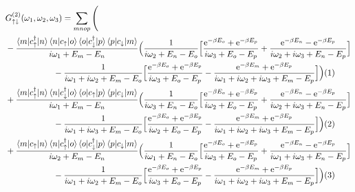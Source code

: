 \documentclass[12pt,a4paper]{scrartcl}
\numberwithin{equation}{section}
\renewcommand{\exp}[1]{\mathrm{e}^{#1}}
\begin{document}
\begin{align}
& G^{(2)}_{\uparrow \downarrow}(\omega_1,\omega_2,\omega_3)
=  \sum_{mnop} \Bigg( \nonumber \\
    & -
 \frac{\braket{m|c^{\dagger}_{\uparrow}|n}\braket{n| c_{\uparrow}|o}\braket{o| c^{\dagger}_{\downarrow} |p}\braket{p| c_{\downarrow} |m}}{i\omega_1 +E_m-E_n}
 \Big( \frac{1}{i\omega_2 +E_n-E_o}
 \Big[
 \frac{\exp{-\beta E_o}+\exp{-\beta E_p} }{i\omega_3 +E_o-E_p} 
  + \frac{ \exp{-\beta E_n} - \exp{-\beta E_p} }{ i\omega_2 + i\omega_3 + E_n- E_p } 
 \Big] \nonumber \\
 & \hspace*{2cm} -  \frac{1}{i\omega_1+ i\omega_2 + E_m-E_o}
 \Big[
  \frac{\exp{-\beta E_o}+\exp{-\beta E_p} }{i\omega_3 +E_o-E_p} 
 -  \frac{ \exp{-\beta E_m}+\exp{-\beta E_p} }{ i\omega_1 + i\omega_2 + i\omega_3 + E_m- E_p } 
 \Big]
 \Big)  (1) \nonumber\\
    &+ 
 \frac{\braket{m|c^{\dagger}_{\uparrow}|n}\braket{n| c^{\dagger}_{\downarrow} |o}\braket{o|c_{\uparrow} |p}\braket{p|c_{\downarrow} |m}}{i\omega_1 +E_m-E_n}
 \Big( \frac{1}{i\omega_3 +E_n-E_o}
 \Big[
 \frac{\exp{-\beta E_o}+\exp{-\beta E_p} }{i\omega_2 +E_o-E_p} 
  + \frac{ \exp{-\beta E_n} - \exp{-\beta E_p} }{ i\omega_2 + i\omega_3 + E_n- E_p } 
 \Big] \nonumber \\
 & \hspace*{2cm} -  \frac{1}{i\omega_1+ i\omega_3 + E_m-E_o}
 \Big[
  \frac{\exp{-\beta E_o}+\exp{-\beta E_p} }{i\omega_2 +E_o-E_p} 
 -  \frac{ \exp{-\beta E_m}+\exp{-\beta E_p} }{ i\omega_1 + i\omega_2 + i\omega_3 + E_m- E_p } 
 \Big]
 \Big) (2) \nonumber  \\
     &+
 \frac{\braket{m|c_{\uparrow}|n}\braket{n| c^{\dagger}_{\uparrow} |o}\braket{o|c^{\dagger}_{\downarrow} |p}\braket{p|c_{\downarrow} |m}}{i\omega_2 +E_m-E_n}
 \Big( \frac{1}{i\omega_1 +E_n-E_o}
 \Big[
 \frac{\exp{-\beta E_o}+\exp{-\beta E_p} }{i\omega_3 +E_o-E_p} 
  + \frac{ \exp{-\beta E_n} - \exp{-\beta E_p} }{ i\omega_1 + i\omega_3 + E_n- E_p } 
 \Big] \nonumber \\
 & \hspace*{2cm} -  \frac{1}{i\omega_1+ i\omega_2 + E_m-E_o}
 \Big[
  \frac{\exp{-\beta E_o}+\exp{-\beta E_p} }{i\omega_3 +E_o-E_p} 
 -  \frac{ \exp{-\beta E_m}+\exp{-\beta E_p} }{ i\omega_1 + i\omega_2 + i\omega_3 + E_m- E_p } 
 \Big]
 \Big) (3) \nonumber\\

\end{align}
\end{document}
